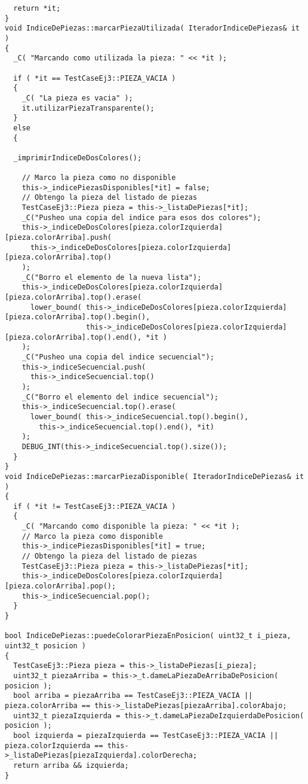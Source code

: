\documentclass[11pt, a4paper, twoside]{article}
\begin{document}
\begin{lstlisting}
  return *it;
}
void IndiceDePiezas::marcarPiezaUtilizada( IteradorIndiceDePiezas& it )
{
  _C( "Marcando como utilizada la pieza: " << *it );

  if ( *it == TestCaseEj3::PIEZA_VACIA )
  {
    _C( "La pieza es vacia" );
    it.utilizarPiezaTransparente();
  }
  else
  {

  _imprimirIndiceDeDosColores();

    // Marco la pieza como no disponible
    this->_indicePiezasDisponibles[*it] = false;
    // Obtengo la pieza del listado de piezas
    TestCaseEj3::Pieza pieza = this->_listaDePiezas[*it];
    _C("Pusheo una copia del indice para esos dos colores");
    this->_indiceDeDosColores[pieza.colorIzquierda][pieza.colorArriba].push(
      this->_indiceDeDosColores[pieza.colorIzquierda][pieza.colorArriba].top()
    );
    _C("Borro el elemento de la nueva lista");
    this->_indiceDeDosColores[pieza.colorIzquierda][pieza.colorArriba].top().erase(
      lower_bound( this->_indiceDeDosColores[pieza.colorIzquierda][pieza.colorArriba].top().begin(),
                   this->_indiceDeDosColores[pieza.colorIzquierda][pieza.colorArriba].top().end(), *it )
    );
    _C("Pusheo una copia del indice secuencial");
    this->_indiceSecuencial.push(
      this->_indiceSecuencial.top()
    );
    _C("Borro el elemento del indice secuencial");
    this->_indiceSecuencial.top().erase(
      lower_bound( this->_indiceSecuencial.top().begin(),
        this->_indiceSecuencial.top().end(), *it)
    );
    DEBUG_INT(this->_indiceSecuencial.top().size());
  }
}
void IndiceDePiezas::marcarPiezaDisponible( IteradorIndiceDePiezas& it )
{
  if ( *it != TestCaseEj3::PIEZA_VACIA )
  {
    _C( "Marcando como disponible la pieza: " << *it );
    // Marco la pieza como disponible
    this->_indicePiezasDisponibles[*it] = true;
    // Obtengo la pieza del listado de piezas
    TestCaseEj3::Pieza pieza = this->_listaDePiezas[*it];
    this->_indiceDeDosColores[pieza.colorIzquierda][pieza.colorArriba].pop();
    this->_indiceSecuencial.pop();
  }
}

bool IndiceDePiezas::puedeColorarPiezaEnPosicion( uint32_t i_pieza, uint32_t posicion )
{
  TestCaseEj3::Pieza pieza = this->_listaDePiezas[i_pieza];
  uint32_t piezaArriba = this->_t.dameLaPiezaDeArribaDePosicion( posicion );
  bool arriba = piezaArriba == TestCaseEj3::PIEZA_VACIA || pieza.colorArriba == this->_listaDePiezas[piezaArriba].colorAbajo;
  uint32_t piezaIzquierda = this->_t.dameLaPiezaDeIzquierdaDePosicion( posicion );
  bool izquierda = piezaIzquierda == TestCaseEj3::PIEZA_VACIA || pieza.colorIzquierda == this->_listaDePiezas[piezaIzquierda].colorDerecha;
  return arriba && izquierda;
}

\end{lstlisting}
\clearpage
\end{document}
